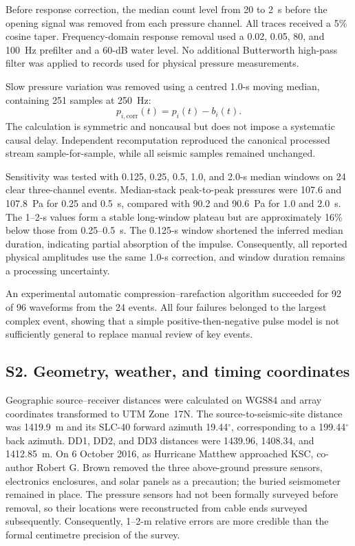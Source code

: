 \documentclass[]{seismica}
\begin{document}
Before response correction, the median count level from 20 to 2~s before the
opening signal was removed from each pressure channel. All traces received a
5\% cosine taper. Frequency-domain response removal used a 0.02, 0.05, 80, and
100~Hz prefilter and a 60-dB water level. No additional Butterworth high-pass
filter was applied to records used for physical pressure measurements.

Slow pressure variation was removed using a centred 1.0-s moving median,
containing 251 samples at 250~Hz:
\begin{equation}
 p_{i,\mathrm{corr}}(t)=p_i(t)-b_i(t).
\end{equation}
The calculation is symmetric and noncausal but does not impose a systematic
causal delay. Independent recomputation reproduced the canonical processed
stream sample-for-sample, while all seismic samples remained unchanged.

Sensitivity was tested with 0.125, 0.25, 0.5, 1.0, and 2.0-s median windows on
24 clear three-channel events. Median-stack peak-to-peak pressures were 107.6
and 107.8~Pa for 0.25 and 0.5~s, compared with 90.2 and 90.6~Pa for 1.0 and
2.0~s. The 1--2-s values form a stable long-window plateau but are
approximately 16\% below those from 0.25--0.5~s. The 0.125-s window shortened
the inferred median duration, indicating partial absorption of the impulse.
Consequently, all reported physical amplitudes use the same 1.0-s correction,
and window duration remains a processing uncertainty.

An experimental automatic compression--rarefaction algorithm succeeded for
92 of 96 waveforms from the 24 events. All four failures belonged to the
largest complex event, showing that a simple positive-then-negative pulse model
is not sufficiently general to replace manual review of key events.

\FloatBarrier
\subsection{S2. Geometry, weather, and timing coordinates}
\label{sec:supp_weather}

Geographic source--receiver distances were calculated on WGS84 and array
coordinates transformed to UTM Zone~17N. The source-to-seismic-site distance
was 1419.9~m and its SLC-40 forward azimuth 19.44$^\circ$, corresponding to a
199.44$^\circ$ back azimuth. DD1, DD2, and DD3 distances were 1439.96,
1408.34, and 1412.85~m. On 6 October 2016, as Hurricane Matthew approached
KSC, co-author Robert G. Brown removed the three above-ground pressure sensors,
electronics enclosures, and solar panels as a precaution; the buried
seismometer remained in place. The pressure sensors had not been formally
surveyed before removal, so their locations were reconstructed from cable ends
surveyed subsequently. Consequently, 1--2-m relative errors are more credible
than the formal centimetre precision of the survey.
\end{document}
